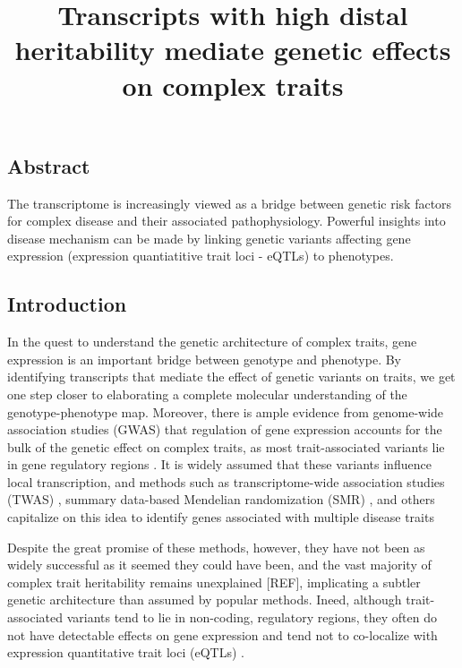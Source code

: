 \documentclass[
]{article}
\title{Transcripts with high distal heritability mediate genetic effects
on complex traits}
\author{}
\date{\vspace{-2.5em}}
\begin{document}
\maketitle

\subsection{Abstract}\label{abstract}

The transcriptome is increasingly viewed as a bridge between genetic
risk factors for complex disease and their associated pathophysiology.
Powerful insights into disease mechanism can be made by linking genetic
variants affecting gene expression (expression quantiatitive trait loci
- eQTLs) to phenotypes.

\subsection{Introduction}\label{introduction}

In the quest to understand the genetic architecture of complex traits,
gene expression is an important bridge between genotype and phenotype.
By identifying transcripts that mediate the effect of genetic variants
on traits, we get one step closer to elaborating a complete molecular
understanding of the genotype-phenotype map. Moreover, there is ample
evidence from genome-wide association studies (GWAS) that regulation of
gene expression accounts for the bulk of the genetic effect on complex
traits, as most trait-associated variants lie in gene regulatory regions
\cite{pmid22955828, 
pmid25363779, pmid21617055, pmid19474294, pmid24702953, 
pmid24316577, pmid27126046}. It is widely assumed that these variants
influence local transcription, and methods such as transcriptome-wide
association studies (TWAS)
\cite{pmid33020666, pmid26258848, pmid27019110, pmid26854917}, summary
data-based Mendelian randomization (SMR) \cite{pmid27019110}, and others
capitalize on this idea to identify genes associated with multiple
disease traits \cite{pmid29567659, pmid35533209, pmid27309819, 
pmid30950127}

Despite the great promise of these methods, however, they have not been
as widely successful as it seemed they could have been, and the vast
majority of complex trait heritability remains unexplained {[}REF{]},
implicating a subtler genetic architecture than assumed by popular
methods. Ineed, although trait-associated variants tend to lie in
non-coding, regulatory regions, they often do not have detectable
effects on gene expression \cite{pmid32912663} and tend not to
co-localize with expression quantitative trait loci (eQTLs)
\cite{pmid36515579, pmid37857933}.
\end{document}
